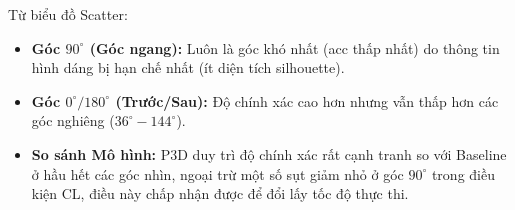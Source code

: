 Từ biểu đồ Scatter:
\begin{itemize}
    \item \textbf{Góc $90^{\circ}$ (Góc ngang):} Luôn là góc khó nhất (acc thấp nhất) do thông tin hình dáng bị hạn chế nhất (ít diện tích silhouette).
    \item \textbf{Góc $0^{\circ}/180^{\circ}$ (Trước/Sau):} Độ chính xác cao hơn nhưng vẫn thấp hơn các góc nghiêng ($36^{\circ}-144^{\circ}$).
    \item \textbf{So sánh Mô hình:} P3D duy trì độ chính xác rất cạnh tranh so với Baseline ở hầu hết các góc nhìn, ngoại trừ một số sụt giảm nhỏ ở góc $90^{\circ}$ trong điều kiện CL, điều này chấp nhận được để đổi lấy tốc độ thực thi.
\end{itemize}



